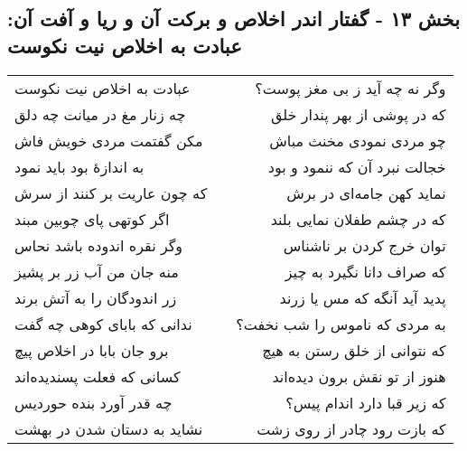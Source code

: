 \begin{center}
\section*{بخش ۱۳ - گفتار اندر اخلاص و برکت آن و ریا و آفت آن: عبادت به اخلاص نیت نکوست}
\label{sec:013}
\begin{longtable}{l p{0.5cm} r}
عبادت به اخلاص نیت نکوست
&&
وگر نه چه آید ز بی مغز پوست؟
\\
چه زنار مغ در میانت چه دلق
&&
که در پوشی از بهر پندار خلق
\\
مکن گفتمت مردی خویش فاش
&&
چو مردی نمودی مخنث مباش
\\
به اندازهٔ بود باید نمود
&&
خجالت نبرد آن که ننمود و بود
\\
که چون عاریت بر کنند از سرش
&&
نماید کهن جامه‌ای در برش
\\
اگر کوتهی پای چوبین مبند
&&
که در چشم طفلان نمایی بلند
\\
وگر نقره اندوده باشد نحاس
&&
توان خرج کردن بر ناشناس
\\
منه جان من آب زر بر پشیز
&&
که صراف دانا نگیرد به چیز
\\
زر اندودگان را به آتش برند
&&
پدید آید آنگه که مس یا زرند
\\
ندانی که بابای کوهی چه گفت
&&
به مردی که ناموس را شب نخفت؟
\\
برو جان بابا در اخلاص پیچ
&&
که نتوانی از خلق رستن به هیچ
\\
کسانی که فعلت پسندیده‌اند
&&
هنوز از تو نقش برون دیده‌اند
\\
چه قدر آورد بنده حوردیس
&&
که زیر قبا دارد اندام پیس؟
\\
نشاید به دستان شدن در بهشت
&&
که بازت رود چادر از روی زشت
\\
\end{longtable}
\end{center}
